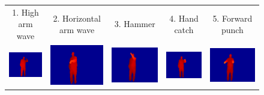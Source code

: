 \documentclass[final,3p,times,twocolumn]{elsarticle}
\begin{document}
\begin{figure}[ht]
{\begin{tabular}{ccccc}
		         1. High arm wave &          2. Horizontal arm wave &          3. Hammer &          4. Hand catch &          5. Forward punch\\
		
				 \includegraphics[width=0.4\columnwidth]{Figures/MSRAction3D_highthrow.pdf} &          \includegraphics[width=0.4\columnwidth]{Figures/MSRAction3D_drawx.pdf} &          \includegraphics[width=0.4\columnwidth]{Figures/MSRAction3D_drawtick.pdf} &          \includegraphics[width=0.4\columnwidth]{Figures/MSRAction3D_drawcircle.pdf} &          \includegraphics[width=0.4\columnwidth]{Figures/MSRAction3D_handclap.pdf} \\
		

\end{tabular}}
\end{figure}
\end{document}
